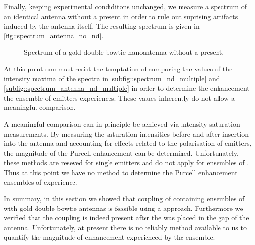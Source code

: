 			Finally, keeping experimental condiditons unchanged, we measure a spectrum of an identical antenna without a \nd present in order to rule out suprising artifacts induced by the antenna itself. The resulting spectrum is given in \autoref{fig::spectrum_antenna_no_nd}.

				\begin{figure}[htp]
					\centering
					\caption[Spectrum of a double bowtie antenna without \nd]{Spectrum of a gold double bowtie nanoantenna without a \nd present.}
					\label{fig::spectrum_antenna_no_nd}
				\end{figure}

			At this point one must resist the temptation of comparing the values of the intensity maxima of the spectra in \autoref{subfig::spectrum_nd_multiple} and \autoref{subfig::spectrum_antenna_nd_multiple} in order to determine the enhancement the ensemble of emitters experiences. These values inherently do not allow a meaningful comparison.

			A meaningful comparison can in principle be achieved via intensity saturation measurements. By measuring the saturation intensities before and after insertion into the antenna and accounting for effects related to the polarisation of emitters, the magnitude of the Purcell enhancement can be determined. Unfortunately, these methods are reseved for single emitters and do not apply for ensembles of \sivs. Thus at this point we have no method to determine the Purcell enhancement ensembles of \sivs experience.

			In summary, in this section we showed that coupling of \nds containing ensembles of \sivs with gold double bowtie antennas is feasible using a \pp approach. Furthermore we verified that the coupling is indeed present after the \nd was placed in the gap of the antenna. Unfortunately, at present there is no reliably method available to us to quantify the magnitude of \fl enhancement experienced by the \siv ensemble.



